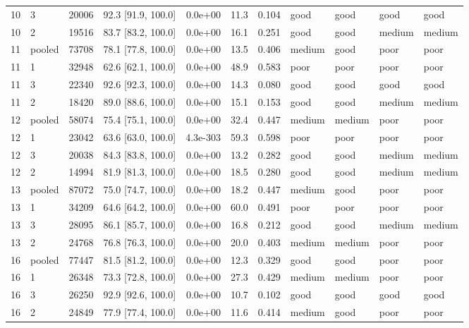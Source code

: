 \begin{longtable}{llrrrrrllll}
10 & 3 & 20006 & 92.3 [91.9, 100.0] & 0.0e+00 & 11.3 & 0.104 & good & good & good & good \\
10 & 2 & 19516 & 83.7 [83.2, 100.0] & 0.0e+00 & 16.1 & 0.251 & good & good & medium & medium \\
11 & pooled & 73708 & 78.1 [77.8, 100.0] & 0.0e+00 & 13.5 & 0.406 & medium & good & poor & poor \\
11 & 1 & 32948 & 62.6 [62.1, 100.0] & 0.0e+00 & 48.9 & 0.583 & poor & poor & poor & poor \\
11 & 3 & 22340 & 92.6 [92.3, 100.0] & 0.0e+00 & 14.3 & 0.080 & good & good & good & good \\
11 & 2 & 18420 & 89.0 [88.6, 100.0] & 0.0e+00 & 15.1 & 0.153 & good & good & medium & medium \\
12 & pooled & 58074 & 75.4 [75.1, 100.0] & 0.0e+00 & 32.4 & 0.447 & medium & medium & poor & poor \\
12 & 1 & 23042 & 63.6 [63.0, 100.0] & 4.3e-303 & 59.3 & 0.598 & poor & poor & poor & poor \\
12 & 3 & 20038 & 84.3 [83.8, 100.0] & 0.0e+00 & 13.2 & 0.282 & good & good & medium & medium \\
12 & 2 & 14994 & 81.9 [81.3, 100.0] & 0.0e+00 & 18.5 & 0.280 & good & good & medium & medium \\
13 & pooled & 87072 & 75.0 [74.7, 100.0] & 0.0e+00 & 18.2 & 0.447 & medium & good & poor & poor \\
13 & 1 & 34209 & 64.6 [64.2, 100.0] & 0.0e+00 & 60.0 & 0.491 & poor & poor & poor & poor \\
13 & 3 & 28095 & 86.1 [85.7, 100.0] & 0.0e+00 & 16.8 & 0.212 & good & good & medium & medium \\
13 & 2 & 24768 & 76.8 [76.3, 100.0] & 0.0e+00 & 20.0 & 0.403 & medium & medium & poor & poor \\
16 & pooled & 77447 & 81.5 [81.2, 100.0] & 0.0e+00 & 12.3 & 0.329 & good & good & poor & poor \\
16 & 1 & 26348 & 73.3 [72.8, 100.0] & 0.0e+00 & 27.3 & 0.429 & medium & medium & poor & poor \\
16 & 3 & 26250 & 92.9 [92.6, 100.0] & 0.0e+00 & 10.7 & 0.102 & good & good & good & good \\
16 & 2 & 24849 & 77.9 [77.4, 100.0] & 0.0e+00 & 11.6 & 0.414 & medium & good & poor & poor \\
\end{longtable}
